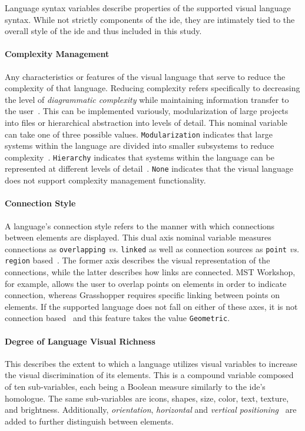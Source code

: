 Language syntax variables describe properties of the supported visual
language syntax. While not strictly components of the \ac{ide}, they are
intimately tied to the overall style of the \ac{ide} and thus included in this
study.


\paragraph{Complexity Management}
Any characteristics or features of the
visual language that serve to reduce the complexity of that language.
Reducing complexity refers specifically to decreasing the level of
\emph{diagrammatic complexity} while maintaining information transfer to
the user~\cite{moody2009}. This can be implemented variously, \eg
modularization of large projects into files or hierarchical abstraction
into levels of detail.
This nominal variable can take one of three possible values.
\texttt{Modularization} indicates that large systems within the language
are divided into smaller subsystems to reduce complexity~\cite{moody2009}.
\texttt{Hierarchy} indicates that systems within the language can be
represented at different levels of detail~\cite{moody2009}.  \texttt{None}
indicates that the visual language does not support complexity management
functionality.


\paragraph{Connection Style}
A language's connection style refers to the manner with which connections
between elements are displayed. This dual axis nominal variable measures
connections as \texttt{overlapping} \emph{vs.} \texttt{linked} as well as
connection sources as \texttt{point} \emph{vs.} \texttt{region}
based~\cite{costagliola2002}. The former axis describes the visual
representation of the connections, while the latter describes how links are
connected. MST Workshop, for example, allows the user to overlap points on
elements in order to indicate connection, whereas Grasshopper requires
specific linking between points on elements.
If the supported language does not fall on either of these axes, it is not
connection based~\cite{costagliola2002} and this feature takes the value
\texttt{Geometric}.


\paragraph{Degree of Language Visual Richness}
This describes the extent to which a language utilizes visual variables to increase the visual discrimination of its elements.
This is a compound variable composed of ten sub-variables, each being a Boolean measure similarly to the \ac{ide}'s homologue.
The same sub-variables are icons, shapes, size, color, text, texture, and brightness.
Additionally, \emph{orientation}, \emph{horizontal} and \emph{vertical positioning}~\cite{moody2009} are added to further distinguish between elements.


